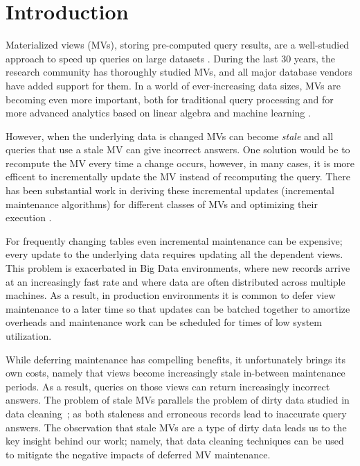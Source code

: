 \vspace{-0.5em}
\section{Introduction}
Materialized views (MVs), storing pre-computed query results, are a well-studied approach to speed up queries on large datasets \cite{LarsonY85, gupta1995maintenance, chirkova2011materialized, halevy2001answering}.
During the last 30 years, the research community has thoroughly studied MVs, and all major database vendors have added support for them.
In a world of ever-increasing data sizes, MVs are becoming even more important, both for traditional query processing
 \cite{lefevre2014opportunistic, bailis2014scalable, perez2014history} and for more advanced analytics based on linear algebra and machine learning \cite{nikolic2014linview, zhang2014mat}.

However, when the underlying data is changed MVs can become \emph{stale} and all queries that use a stale MV can give incorrect answers. 
One solution would be to recompute the MV every time a change occurs, however, in many cases, it is more efficent to incrementally update the MV instead of recomputing the query.
There has been substantial work in deriving these incremental updates (incremental maintenance algorithms) for different classes of MVs and optimizing their execution \cite{gupta1995maintenance, DBLP:conf/sigmod/GriffinL95, griffin1997improved, samtani1999self, DBLP:conf/sac/TrutaC07, DBLP:journals/vldb/KochAKNNLS14, chirkova2011materialized}.

For frequently changing tables even incremental maintenance can be expensive; every update to the underlying data requires updating all the dependent views.  
This problem is exacerbated in Big Data environments, where new records arrive at an increasingly fast rate and where data are often 
distributed across multiple machines.  
As a result, in production environments it is common to defer view maintenance to a later time \cite{chirkova2011materialized, zhou2007lazy, DBLP:conf/sigmod/ColbyGLMT96} so that updates can be batched together to amortize overheads and maintenance work can be scheduled for times of low system utilization.  

While deferring maintenance has compelling benefits, it unfortunately brings its own costs, namely that views become increasingly stale in-between maintenance periods. As a result, queries on those views can return increasingly incorrect answers.
The problem of stale MVs parallels the problem of dirty data studied in data cleaning~\cite{rahm2000data}; as both staleness and erroneous records lead to inaccurate query answers.
The observation that stale MVs are a type of dirty data leads us to the key insight behind our work; namely, that data cleaning techniques can be used to mitigate the negative impacts
of deferred MV maintenance.

